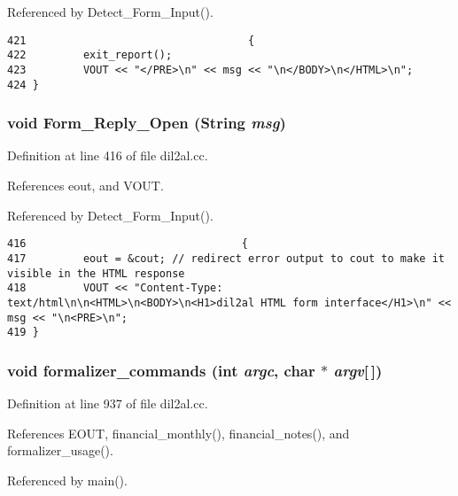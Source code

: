 Referenced by Detect\_\-Form\_\-Input().



\footnotesize\begin{verbatim}421                                   {
422         exit_report();
423         VOUT << "</PRE>\n" << msg << "\n</BODY>\n</HTML>\n";
424 }
\end{verbatim}\normalsize 
{}
\subsubsection{\setlength{\rightskip}{0pt plus 5cm}void Form\_\-Reply\_\-Open ({\bf String} {\em msg})}\label{dil2al_8cc_a106}




Definition at line 416 of file dil2al.cc.

References eout, and VOUT.

Referenced by Detect\_\-Form\_\-Input().



\footnotesize\begin{verbatim}416                                  {
417         eout = &cout; // redirect error output to cout to make it visible in the HTML response
418         VOUT << "Content-Type: text/html\n\n<HTML>\n<BODY>\n<H1>dil2al HTML form interface</H1>\n" << msg << "\n<PRE>\n";
419 }
\end{verbatim}\normalsize 
{}
\subsubsection{\setlength{\rightskip}{0pt plus 5cm}void formalizer\_\-commands (int {\em argc}, char $\ast$ {\em argv}[$\,$])}\label{dil2al_8cc_a114}




Definition at line 937 of file dil2al.cc.

References EOUT, financial\_\-monthly(), financial\_\-notes(), and formalizer\_\-usage().

Referenced by main().




